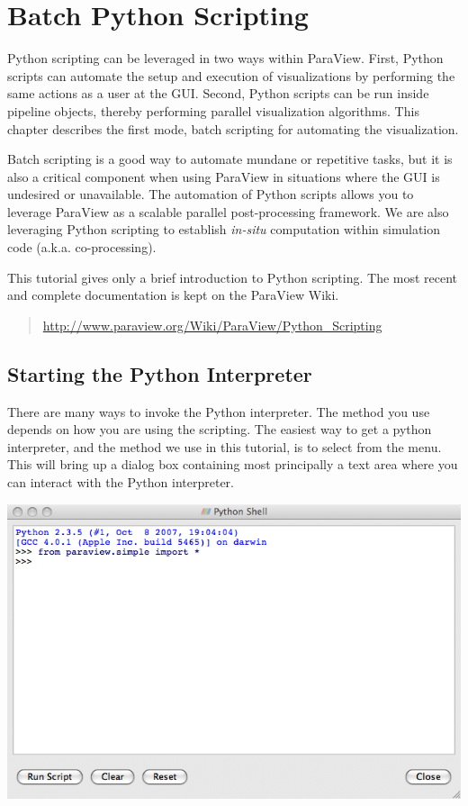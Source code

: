 \chapter{Batch Python Scripting}
\label{chap:BatchPythonScripting}

Python scripting can be leveraged in two ways within ParaView.  First,
Python scripts can automate the setup and execution of visualizations by
performing the same actions as a user at the GUI.  Second, Python scripts
can be run inside pipeline objects, thereby performing parallel
visualization algorithms.  This chapter describes the first mode, batch
scripting for automating the visualization.

Batch scripting is a good way to automate mundane or repetitive tasks, but
it is also a critical component when using ParaView in situations where the
GUI is undesired or unavailable.  The automation of Python scripts allows
you to leverage ParaView as a scalable parallel post-processing framework.
We are also leveraging Python scripting to establish \emph{in-situ}
computation within simulation code (a.k.a. co-processing).

This tutorial gives only a brief introduction to Python scripting.  The
most recent and complete documentation is kept on the ParaView Wiki.

\begin{quote}
  \href{http://www.paraview.org/Wiki/ParaView/Python_Scripting}{http://www.paraview.org/Wiki/ParaView/Python\_Scripting}
\end{quote}

\section{Starting the Python Interpreter}
\label{sec:StartingThePythonInterpreter}

There are many ways to invoke the Python interpreter.  The method you use
depends on how you are using the scripting.  The easiest way to get a
python interpreter, and the method we use in this tutorial, is to select
 \ra {} from the menu.  This will bring up a
dialog box containing most principally a text area where you can interact
with the Python interpreter.

\begin{inlinefig}
  \includegraphics[width=.83\scw]{images/PythonShellDialog}
\end{inlinefig}

